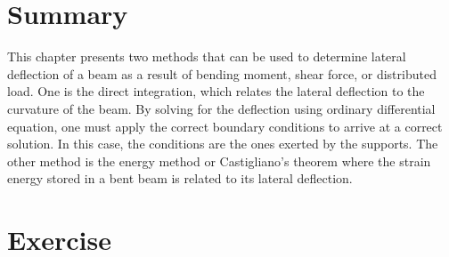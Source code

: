 \documentclass[
fontsize=10pt,
a4paper,
twosides=false,
open=any,
svgnames,
]{kaobook} %
\begin{document}
\section*{Summary}

This chapter presents two methods that can be used to determine lateral deflection of a beam as a result of bending moment, shear force, or distributed load. One is the direct integration, which relates the lateral deflection to the curvature of the beam. By solving for the deflection using ordinary differential equation, one must apply the correct boundary conditions to arrive at a correct solution. In this case, the conditions are the ones exerted by the supports. The other method is the energy method or Castigliano’s theorem where the strain energy stored in a bent beam is related to its lateral deflection.

\section*{Exercise}
\end{document}
